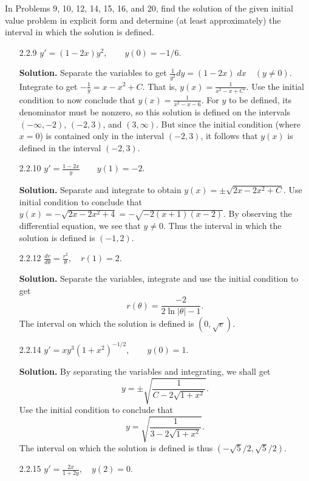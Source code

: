 In Problems 9, 10, 12, 14, 15, 16, and 20, find the solution of the given
initial value problem in explicit form and determine (at least approximately)
the interval in which the solution is defined.
\begin{enumerate}
   \item[2.2.9]   $y' = (1 - 2x)y^2, \qquad y(0) = -1/6$.

      \textbf{Solution.} Separate the variables to get
      $\frac{1}{y^2}dy = (1 - 2x)\;dx \quad (y \neq 0)$. Integrate to get
      $-\frac{1}{y} = x - x^2 + C$. That is, $y(x) = \frac{1}{x^2 - x + C'}$.
      Use the initial condition to now conclude that
      $y(x) = \frac{1}{x^2 - x - 6}$. For $y$ to be defined, its denominator
      must be nonzero, so this solution is defined on the intervals
      $(-\infty, -2)$, $(-2, 3)$, and $(3, \infty)$. But since the initial
      condition (where $x = 0$) is contained only in the interval $(-2, 3)$, it
      follows that $y(x)$ is defined  in the interval $(-2, 3)$.
   \item[2.2.10]  $y' = \frac{1-2x}{y} \qquad y(1) = -2$.

      \textbf{Solution.} Separate and integrate to obtain
      $y(x) = \pm\sqrt{2x-2x^2+C}$. Use initial condition to conclude that
      $y(x) = -\sqrt{2x-2x^2+4} = -\sqrt{-2(x+1)(x-2)}$. By observing the
      differential equation, we see that $y \neq 0$. Thus the interval in which
      the solution is defined is $(-1, 2)$.
   \item[2.2.12]  $\frac{dr}{d\theta} = \frac{r^2}{\theta}, \quad r(1) = 2$.

      \textbf{Solution.} Separate the variables, integrate and use the initial
      condition to get
      $$r(\theta) = \frac{-2}{2\ln|\theta| - 1}.$$
      The interval on which the solution is defined is $(0, \sqrt{e})$.
   \item[2.2.14]  $y' = xy^3(1+x^2)^{-1/2}, \qquad y(0) = 1$.

      \textbf{Solution.} By separating the variables and integrating, we shall
      get
      $$y = \pm\sqrt{\frac{1}{C - 2\sqrt{1+x^2}}}.$$
      Use the initial condition to conclude that
      $$y = \sqrt{\frac{1}{3 - 2\sqrt{1+x^2}}}.$$
      The interval on which the solution is defined is thus
      $(-\sqrt{5}/2, \sqrt{5}/2)$.
   \item[2.2.15]  $y' = \frac{2x}{1+2y}, \quad y(2) = 0$.


\end{enumerate}
